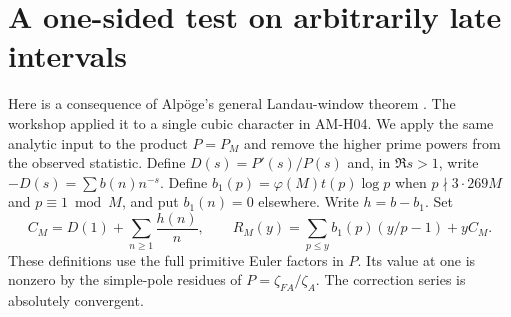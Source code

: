 \documentclass[11pt]{article}
\begin{document}
\section{A one-sided test on arbitrarily late intervals}
Here is a consequence of Alp\"oge's general Landau-window theorem
\cite{A}. The workshop applied it to a single cubic character in AM-H04.
We apply the same analytic input to the product $P=P_M$ and remove the
higher prime powers from the observed statistic.
Define $D(s)=P'(s)/P(s)$ and, in $\Re s>1$, write
$-D(s)=\sum b(n)n^{-s}$. Define $b_1(p)=\varphi(M)t(p)\log p$
when $p\nmid3\cdot269M$ and $p\equiv1\bmod M$, and put $b_1(n)=0$
elsewhere. Write $h=b-b_1$. Set
\[
C_M=D(1)+\sum_{n\ge1}\frac{h(n)}n,\qquad
R_M(y)=\sum_{p\le y} b_1(p)(y/p-1)+y C_M .
\]
These definitions use the full primitive Euler factors in $P$. Its value
at one is nonzero by the simple-pole residues of
$P=\zeta_{FA}/\zeta_A$. The correction series is absolutely convergent.
\end{document}
